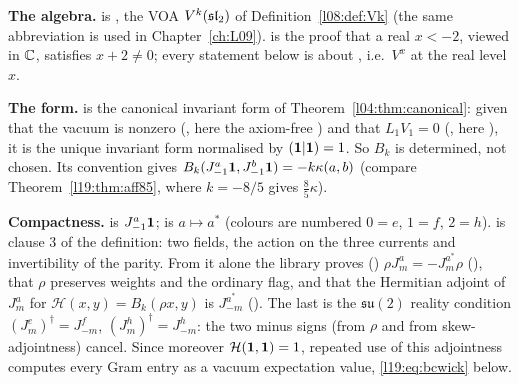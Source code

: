 \begin{dictionary}
\textbf{The algebra.}  is , the VOA $V^k(\mathfrak{sl}_2)$ of
Definition~\ref{l08:def:Vk} (the same abbreviation is used in Chapter~\ref{ch:L09}). 
is the proof that a real $x<-2$, viewed in ${\mathbb{C}}$, satisfies $x+2\ne0$; every statement below is about
, i.e.\ $V^x$ at the real level $x$.

\textbf{The form.}  is the canonical invariant form of
Theorem~\ref{l04:thm:canonical}: given that the vacuum is nonzero (, here the axiom-free
) and that $L_1V_1 = 0$ (, here ), it is the unique
invariant form normalised by $(\mathbf{1}|\mathbf{1}) = 1$. So $B_k$ is determined, not chosen. Its
convention gives $B_k(J^a_{-1}\mathbf{1},J^b_{-1}\mathbf{1}) = -k\kappa(a,b)$ (compare
Theorem~\ref{l19:thm:aff85}, where $k = -8/5$ gives $\tfrac85\kappa$).

\textbf{Compactness.}  is $J^a_{-1}\mathbf{1}$;  is $a\mapsto a^*$
(colours are numbered $0 = e$, $1 = f$, $2 = h$).  is clause 3 of the definition:
two fields, the action on the three currents and invertibility of the parity. From it alone the library proves
() $\rho J^a_m = -J^{a^*}_m\rho$ (), that $\rho$ preserves weights
and the ordinary flag, and that the Hermitian adjoint of $J^a_m$ for $\mathcal H(x,y) = B_k(\rho x,y)$ is $J^{a^*}_{-m}$
(). The last is the $\mathfrak{su}(2)$ reality condition $(J^e_m)^\dagger = J^f_{-m}$,
$(J^h_m)^\dagger = J^h_{-m}$: the two minus signs (from $\rho$ and from skew-adjointness) cancel. Since moreover
$\mathcal H(\mathbf{1},\mathbf{1}) = 1$, repeated use of this adjointness computes every Gram entry as a vacuum expectation
value, \eqref{l19:eq:bcwick} below.


\end{dictionary}
